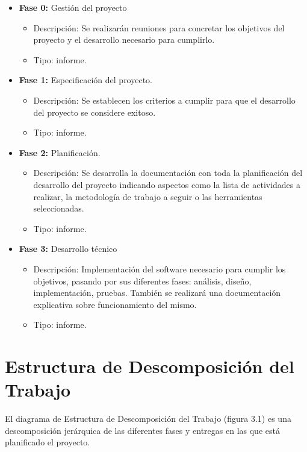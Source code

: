 \begin{itemize}
  \item \textbf{Fase 0:} Gestión del proyecto
  \begin{itemize}
    \item Descripción: Se realizarán reuniones para concretar los objetivos del proyecto y el desarrollo necesario para 
    cumplirlo.
    \item Tipo: informe.
  \end{itemize}
  \item \textbf{Fase 1:} Especificación del proyecto.
  \begin{itemize}
    \item Descripción: Se establecen los criterios a cumplir para que el desarrollo del proyecto se considere exitoso.
    \item Tipo: informe.
  \end{itemize}
  \item \textbf{Fase 2:} Planificación.
  \begin{itemize}
    \item Descripción: Se desarrolla la documentación con toda la planificación del desarrollo del proyecto indicando aspectos
    como la lista de actividades a realizar, la metodología de trabajo a seguir o las herramientas seleccionadas.
    \item Tipo: informe.
  \end{itemize}
  \item \textbf{Fase 3:} Desarrollo técnico
  \begin{itemize}
    \item Descripción: Implementación del software necesario para cumplir los objetivos, pasando por sus diferentes fases: 
    análisis, diseño, implementación, pruebas. También se realizará una documentación explicativa sobre funcionamiento del 
    mismo.
    \item Tipo: informe.
  \end{itemize}
\end{itemize}

\section{Estructura de Descomposición del Trabajo}

El diagrama de Estructura de Descomposición del Trabajo (figura 3.1) es una descomposición jerárquica de las diferentes fases y 
entregas en las que está planificado el proyecto.

